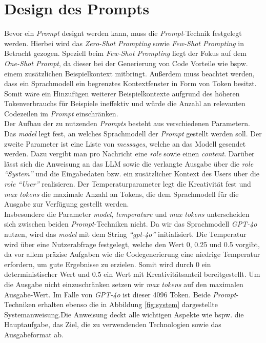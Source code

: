 \section{Design des Prompts}\label{section:prompt}
Bevor ein \textit{Prompt} designt werden kann, muss die \textit{Prompt}-Technik festgelegt werden. Hierbei wird das \textit{Zero-Shot Prompting} sowie \textit{Few-Shot Prompting} in Betracht gezogen. Speziell beim \textit{Few-Shot Prompting} liegt der Fokus auf dem \textit{One-Shot Prompt}, da dieser bei der Generierung von Code Vorteile wie bspw. einem zusätzlichen Beispielkontext mitbringt. Außerdem muss beachtet werden, dass ein Sprachmodell ein begrenztes Kontextfenster in Form von Token besitzt. Somit wäre ein Hinzufügen weiterer Beispielkontexte aufgrund des höheren Tokenverbrauchs für Beispiele ineffektiv und würde die Anzahl an relevanten Codezeilen im \textit{Prompt} einschränken.\\
Der Aufbau der zu nutzenden \textit{Prompts} besteht aus verschiedenen Parametern. Das \textit{model} legt fest, an welches Sprachmodell der \textit{Prompt} gestellt werden soll. Der zweite Parameter ist eine Liste von \textit{messages}, welche an das Modell gesendet werden. Dazu vergibt man pro Nachricht eine \textit{role} sowie einen \textit{content}. Darüber lässt sich die Anweisung an das LLM sowie die verlangte Ausgabe über die \textit{role} \textit{``System''} und die Eingabedaten bzw. ein zusätzlicher Kontext des Users über die \textit{role} \textit{``User''} realisieren. Der Temperaturparameter legt die Kreativität fest und \textit{max tokens} die maximale Anzahl an Tokens, die dem Sprachmodell für die Ausgabe zur Verfügung gestellt werden.\\
Insbesondere die Parameter \textit{model}, \textit{temperature} und \textit{max tokens} unterscheiden sich zwischen beiden \textit{Prompt}-Techniken nicht. Da wir das Sprachmodell \textit{GPT-4o} nutzen, wird das \textit{model} mit dem String \textit{``gpt-4o''} initialisiert. Die Temperatur wird über eine Nutzerabfrage festgelegt, welche den Wert 0, 0.25 und 0.5 vorgibt, da vor allem präzise Aufgaben wie die Codegenerierung eine niedrige Temperatur erfordern, um gute Ergebnisse zu erzielen. \cite*{renzeEffectSamplingTemperature2024} Somit wird durch 0 ein deterministischer Wert und 0.5 ein Wert mit Kreativitätsanteil bereitgestellt. Um die Ausgabe nicht einzuschränken setzen wir \textit{max tokens} auf den maximalen Ausgabe-Wert. Im Falle von \textit{GPT-4o} ist dieser 4096 Token. Beide \textit{Prompt}-Techniken erhalten ebenso die in Abbildung \ref{fig:system} dargestellte Systemanweisung.Die Anweisung deckt alle wichtigen Aspekte wie bspw. die Hauptaufgabe, das Ziel, die zu verwendenden Technologien sowie das Ausgabeformat ab. \\
